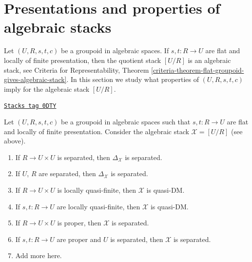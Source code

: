 \section{Presentations and properties of algebraic stacks}
\label{stacks-morphisms-section-presentations-properties}
Let $(U, R, s, t, c)$ be a groupoid in algebraic spaces.
If $s, t : R \to U$ are flat and locally of finite presentation,
then the quotient stack $[U/R]$ is an algebraic stack, see
Criteria for Representability, Theorem
\ref{criteria-theorem-flat-groupoid-gives-algebraic-stack}.
In this section we study what properties of $(U, R, s, t, c)$
imply for the algebraic stack $[U/R]$.

\begin{lemma}
\label{stacks-morphisms-lemma-properties-diagonal-from-presentation}
\href{https://stacks.math.columbia.edu/tag/0DTY}{\texttt{Stacks tag 0DTY}}

Let $(U, R, s, t, c)$ be a groupoid in algebraic spaces such that
$s, t : R \to U$ are flat and locally of finite presentation.
Consider the algebraic stack $\mathcal{X} = [U/R]$ (see above).
\begin{enumerate}
\item If $R \to U \times U$ is separated, then
$\Delta_\mathcal{X}$ is separated.
\item If $U$, $R$ are separated, then $\Delta_\mathcal{X}$ is separated.
\item If $R \to U \times U$ is locally quasi-finite, then $\mathcal{X}$
is quasi-DM.
\item If $s, t : R \to U$ are locally quasi-finite, then
$\mathcal{X}$ is quasi-DM.
\item If $R \to U \times U$ is proper, then $\mathcal{X}$ is separated.
\item If $s, t : R \to U$ are proper and $U$ is separated, then
$\mathcal{X}$ is separated.
\item Add more here.
\end{enumerate}
\end{lemma}

